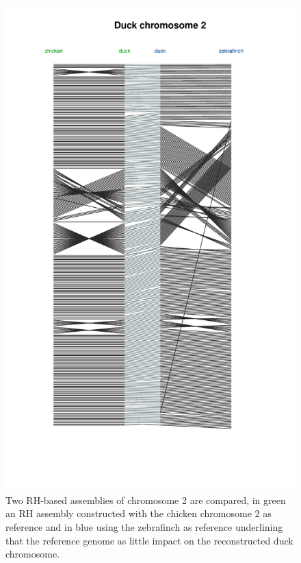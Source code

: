 \documentclass[10pt,letterpaper]{article}
\begin{document}
\begin{figure}[h!]
   \includegraphics[scale=0.7]{figure2_chicken_duck_zebrafinch.pdf}
  \caption{ Two RH-based assemblies of chromosome 2 are compared, in green an RH assembly constructed with the chicken chromosome 2 as reference and in blue using the zebrafinch as reference underlining that the reference genome as little impact on the reconstructed duck chromosome.}
\label{fig2}
\end{figure}
\end{document}
